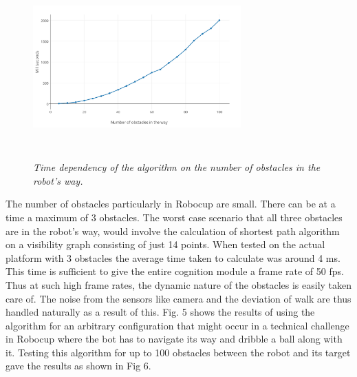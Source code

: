 \documentclass[letterpaper, 10 pt, conference]{ieeeconf}  %
\begin{document}
\begin{figure}[h]  
\begin{center}  
\includegraphics[width=8cm, height = 7cm]{test2.jpg}  
\caption{\small \sl Time dependency of the algorithm on the number of obstacles in the robot's way. \label{fig:test2}}  
\end{center}  
\end{figure}

The number of obstacles particularly in Robocup are small. There can be at a time a maximum of 3 obstacles. The worst case scenario that all three obstacles are in the robot's way, would involve the calculation of shortest path algorithm on a visibility graph consisting of just 14 points. When tested on the actual platform with 3 obstacles the average time taken to calculate was around 4 ms. This time is sufficient to give the entire cognition module a frame rate of 50 fps. Thus at such high frame rates, the dynamic nature of the obstacles is easily taken care of. The noise from the sensors like camera and the deviation of walk are thus handled naturally as a result of this. Fig. 5 shows the results of using the algorithm for an arbitrary configuration that might occur in a technical challenge in Robocup where the bot has to navigate its way and dribble a ball along with it. Testing this algorithm for up to 100 obstacles between the robot and its target gave the results as shown in Fig 6.
 
\end{document}
